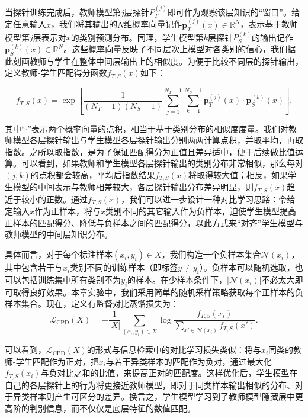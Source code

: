 \documentclass[../main.tex]{subfiles}
\begin{document}
当探针训练完成后，教师模型第$j$层探针$P_T^{(j)}$即可作为观察该层知识的“窗口”。给定任意输入$x$，我们将其输出的$N$维概率向量记作$\mathbf{p}_T^{(j)}(x)\in\mathbb{R}^N$，表示基于教师模型第$j$层表示对$x$的类别预测分布。同理，学生模型第$k$层探针$P_S^{(k)}$的输出记作$\mathbf{p}_S^{(k)}(x) \in\mathbb{R}^N$。这些概率向量反映了不同层次上模型对各类别的信心，我们据此刻画教师与学生在整体中间层输出上的相似度。为便于比较不同层的探针输出，定义教师-学生匹配得分函数$f_{T,S}(x)$如下：

\begin{equation}
	\label{eq:f-match}
	f_{T,S}(x) = \exp\left[\frac{1}{(N_T-1)(N_S-1)} \sum_{j=1}^{N_T-1}\sum_{k=1}^{N_S-1} \mathbf{p}_T^{(j)}(x) \cdot \mathbf{p}_S^{(k)}(x)\right] .
\end{equation}

其中“$\cdot$”表示两个概率向量的点积，相当于基于类别分布的相似度度量。我们对教师模型各层探针输出与学生模型各层探针输出分别两两计算点积，并取平均，再取指数。之所以取指数，是为了保证匹配得分为正值且差异适中，便于后续做比值运算。可以看到，如果教师和学生模型各层探针输出的类别分布非常相似，那么每对$(j,k)$的点积都会较高，平均后指数结果$f_{T,S}(x)$将取得较大值；相反，如果学生模型的中间表示与教师相差较大，各层探针输出分布差异明显，则$f_{T,S}(x)$趋近于较小的正数。通过$f_{T,S}(x)$，我们可以进一步设计一种对比学习思路：令给定输入$x$作为正样本，将与$x$类别不同的其它输入作为负样本，迫使学生模型提高正样本的匹配得分、降低与负样本之间的匹配得分，以此方式来“对齐”学生模型与教师模型的中间层知识分布。

具体而言，对于每个标注样本$(x_i, y_i)\in X$，我们构造一个负样本集合$\mathcal{N}(x_i)$，其中包含若干与$x_i$类别不同的训练样本（即标签$y \neq y_i$）。负样本可以随机选取，也可以包括训练集中所有类别不为$y_i$的样本。在少样本条件下，$|\mathcal{N}(x_i)|$不必太大即可取得良好效果。本章实验中，我们采用简单的随机采样策略获取每个正样本的负样本集合。现在，定义有监督对比蒸馏损失为：
\begin{equation}
	\label{eq:cpd-loss-sup}
	\mathcal{L}_{\text{CPD}}(X) = -\frac{1}{|X|} \sum_{(x_i, y_i)\in X} \log \frac{f_{T,S}(x_i)}{\sum_{x' \in \mathcal{N}(x_i)} f_{T,S}(x')} .
\end{equation}

可以看到，$\mathcal{L}_{\text{CPD}}(X)$的形式与信息检索中的对比学习损失类似：将与$x_i$同类的教师-学生匹配作为正对，把$x_i$与若干异类样本的匹配作为负对，通过最大化$f_{T,S}(x_i)$与负对比之和的比值，来提高正对的匹配度。这样优化后，学生模型在自己的各层探针上的行为将更接近教师模型，即对于同类样本输出相似的分布、对于异类样本则产生可区分的差异。换言之，学生模型学习到了教师模型隐藏层中更高阶的判别信息，而不仅仅是底层特征的数值匹配。
\end{document}
